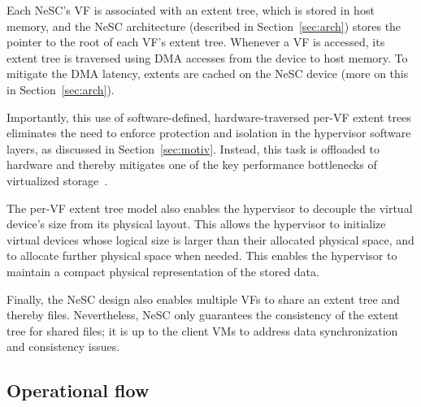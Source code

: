 Each  NeSC's VF is associated with an extent tree, which is stored in host memory, and the NeSC architecture (described in Section~\ref{sec:arch}) stores the pointer to the root of each VF's extent tree. Whenever a VF is accessed, its extent tree is traversed using DMA accesses from the device to host memory. To mitigate the DMA latency, extents are cached on the NeSC device (more on this in Section~\ref{sec:arch}).

Importantly, this use of software-defined, hardware-traversed per-VF extent trees eliminates the need to enforce protection and isolation in the hypervisor software layers, as discussed in Section~\ref{sec:motiv}. Instead, this task is offloaded to hardware and thereby mitigates one of the key performance bottlenecks of virtualized storage~\cite{le12nested}.

The per-VF extent tree model also enables the hypervisor to decouple the virtual device's size from its physical layout. This allows the hypervisor to initialize virtual devices whose logical size is larger than their allocated physical space, and to allocate further physical space when needed. This enables the hypervisor to maintain a compact physical representation of the stored data.

Finally, the NeSC design also enables multiple VFs to share an extent tree and thereby files. Nevertheless, NeSC only guarantees the consistency of the extent tree for shared files; it is up to the client VMs to address data synchronization and consistency issues.

\subsection{Operational flow}

